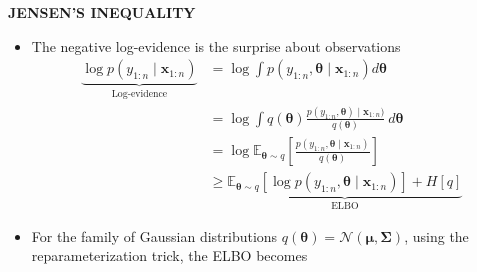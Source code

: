 \begin{whitebox}{\textbf{JENSEN'S INEQUALITY}}
    \begin{itemize}
        \item The negative log-evidence is the surprise about observations
        \begin{align*}
            \underbrace{\log p(y_{1:n}\mid \bm{x}_{1:n})}_{\text{Log-evidence}}&=\log\int p(y_{1:n},\bm{\theta}\mid \bm{x}_{1:n})d\bm{\theta}\\
            &=\log\int q(\bm{\theta})\frac{p(y_{1:n},\bm{\theta})\mid \bm{x}_{1:n})}{q(\bm{\theta})}\ d\bm{\theta}\\
            &=\log\mathbb{E}_{\bm{\theta}\sim q}\left[\frac{p(y_{1:n},\bm{\theta}\mid \bm{x}_{1:n})}{q(\bm{\theta})}\right]\\
            &\geq\underbrace{\mathbb{E}_{\bm{\theta}\sim q}[\log p(y_{1:n},\bm{\theta}\mid \bm{x}_{1:n})]+H[q]}_{\text{ELBO}}
        \end{align*}
        \item For the family of Gaussian distributions $q(\bm{\theta})=\mathcal{N}(\bm{\mu},\bm{\Sigma})$, using the reparameterization trick, the ELBO becomes
        \begin{center}
        \end{center}
    \end{itemize}
\end{whitebox}

